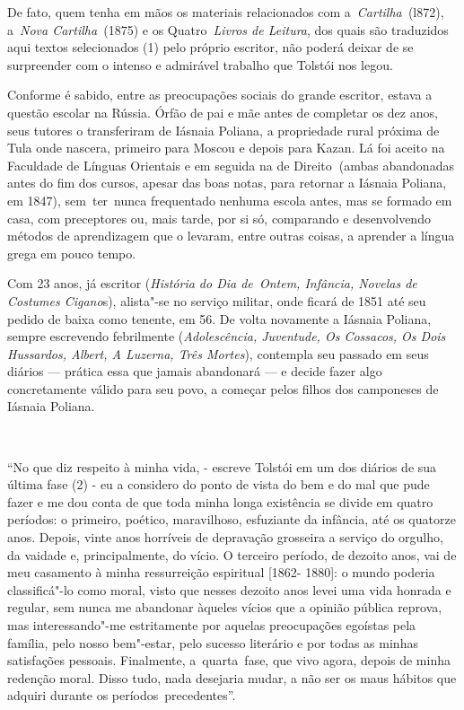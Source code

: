 De fato, quem tenha em mãos os materiais relacionados com
a~\emph{Cartilha~}(l872), a~\emph{Nova Cartilha~}(1875) e os
Quatro~\emph{Livros de Leitura}, dos quais são traduzidos aqui textos
selecionados (1) pelo próprio escritor, não poderá deixar de se
surpreender com o intenso e admirável trabalho que Tolstói nos legou.

Conforme é sabido, entre as preocupações sociais do grande escritor,
estava a questão escolar na Rússia. Órfão de pai e mãe antes de
completar os dez anos, seus tutores o transferiram de Iásnaia Poliana, a
propriedade rural próxima de Tula onde nascera, primeiro para Moscou e
depois para Kazan. Lá foi aceito na Faculdade de Línguas Orientais e em
seguida na de Direito\textbf{~}(ambas abandonadas antes do fim dos
cursos, apesar das boas notas, para retornar a Iásnaia Poliana, em
1847), sem~ter~nunca frequentado nenhuma escola antes, mas se formado em
casa, com preceptores ou, mais tarde, por si só, comparando e
desenvolvendo métodos de aprendizagem que o levaram, entre outras
coisas, a aprender a língua grega em pouco tempo.

Com 23 anos, já escritor (\emph{História do Dia de~Ontem, Infância,
Novelas de Costumes Cigano}s), alista"-se no serviço militar, onde ficará
de 1851 até seu pedido de baixa como tenente, em 56. De volta novamente
a Iásnaia Poliana, sempre escrevendo febrilmente (\emph{Adolescência,
Juventude, Os Cossacos, Os Dois Hussardos, Albert, A Luzerna, Três
Mortes}), contempla seu passado em seus diários --- prática essa que
jamais abandonará --- e decide fazer algo concretamente válido para seu
povo, a começar pelos filhos dos camponeses de Iásnaia Poliana.~

~

``No que diz respeito à minha vida, - escreve Tolstói em um dos diários
de sua última fase (2) - eu a considero do ponto de vista do bem e do
mal que pude fazer e me dou conta de que toda minha longa existência se
divide em quatro períodos: o primeiro, poético, maravilhoso, esfuziante
da infância, até os quatorze anos. Depois, vinte anos horríveis de
depravação grosseira a serviço do orgulho, da vaidade e, principalmente,
do vício. O terceiro período, de dezoito anos, vai de meu casamento à
minha ressurreição espiritual {[}1862- 1880{]}: o mundo poderia
classificá"-lo como moral, visto que nesses dezoito anos levei uma vida
honrada e regular, sem nunca me abandonar àqueles vícios que a opinião
pública reprova, mas interessando"-me estritamente por aquelas
preocupações egoístas pela família, pelo nosso bem"-estar, pelo sucesso
literário e por todas as minhas satisfações pessoais. Finalmente,
a~quarta~fase, que vivo agora, depois de minha redenção moral. Disso
tudo, nada desejaria mudar, a não ser os maus hábitos que adquiri
durante os períodos~precedentes''.

